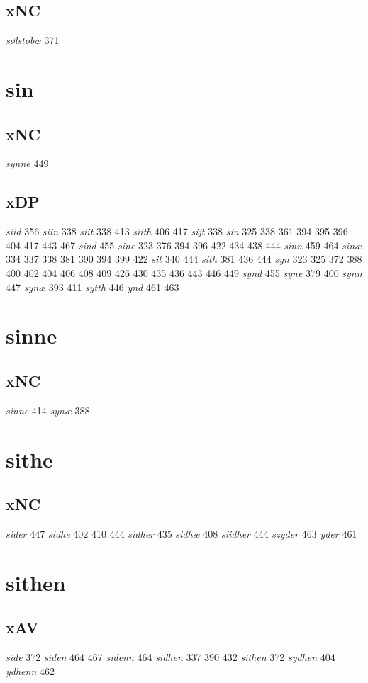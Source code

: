 \documentclass[a4paper,twocolumn]{article}
\begin{document}
\subsection{xNC}
\label{sec:orgadac46a}
\emph{sølstobæ} 371 
\section{sin}
\label{sec:org1d11dfc}
\subsection{xNC}
\label{sec:org1daaa8d}
\emph{synne} 449 
\subsection{xDP}
\label{sec:org4a30920}
\emph{siid} 356 \emph{siin} 338 \emph{siit} 338 413 \emph{siith} 406 417 \emph{sijt} 338 \emph{sin} 325 338 361 394 395 396 404 417 443 467 \emph{sind} 455 \emph{sine} 323 376 394 396 422 434 438 444 \emph{sinn} 459 464 \emph{sinæ} 334 337 338 381 390 394 399 422 \emph{sit} 340 444 \emph{sith} 381 436 444 \emph{syn} 323 325 372 388 400 402 404 406 408 409 426 430 435 436 443 446 449 \emph{synd} 455 \emph{syne} 379 400 \emph{synn} 447 \emph{synæ} 393 411 \emph{sytth} 446 \emph{ynd} 461 463 
\section{sinne}
\label{sec:org2dd63c6}
\subsection{xNC}
\label{sec:org50ba57e}
\emph{sinne} 414 \emph{synæ} 388 
\section{sithe}
\label{sec:orgb88790b}
\subsection{xNC}
\label{sec:orgc1e9248}
\emph{sider} 447 \emph{sidhe} 402 410 444 \emph{sidher} 435 \emph{sidhæ} 408 \emph{siidher} 444 \emph{szyder} 463 \emph{yder} 461 
\section{sithen}
\label{sec:org246a99e}
\subsection{xAV}
\label{sec:orge2b9987}
\emph{side} 372 \emph{siden} 464 467 \emph{sidenn} 464 \emph{sidhen} 337 390 432 \emph{sithen} 372 \emph{sydhen} 404 \emph{ydhenn} 462 
\end{document}
